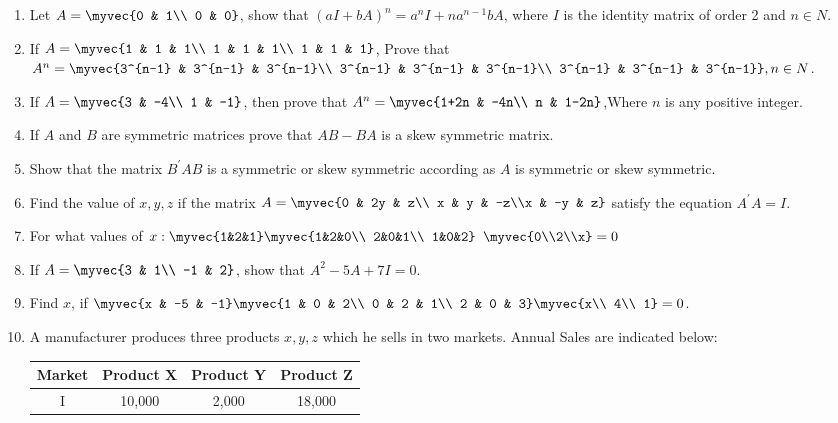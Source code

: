 \begin{enumerate}
\item Let $A=\myvec{0 & 1\\ 0 & 0}$, show that $(aI+bA)^n= a^nI+na^{n-1} bA$, where $I$ is the identity matrix of order 2 and $n \in N$.
\item If $A=\myvec{1 & 1 & 1\\ 1 & 1 & 1\\ 1 & 1 & 1}$, Prove that $A^n=\myvec{3^{n-1} & 3^{n-1} & 3^{n-1}\\ 3^{n-1} & 3^{n-1} & 3^{n-1}\\ 3^{n-1} & 3^{n-1} & 3^{n-1}}, n \in N$.
\item If $A=\myvec{3 & -4\\ 1 & -1}$, then prove that $A^n=\myvec{1+2n & -4n\\ n & 1-2n}$,Where $n$ is any positive integer.
\item If $A$ and $B$ are symmetric matrices prove that $AB-BA$ is a skew symmetric matrix.
\item Show that the matrix  $B^{\prime}AB$ is a symmetric or skew symmetric according as $A$ is symmetric or skew symmetric.
\item Find the value of $x,y,z$ if the matrix $A=\myvec{0 & 2y & z\\ x & y & -z\\x & -y & z}$ satisfy the equation $A^{\prime}A=I$.
\item For what values  of $x : \myvec{1&2&1} \myvec{1&2&0\\ 2&0&1\\ 1&0&2}$ $\myvec{0\\2\\x}=0$
\item If $A=\myvec{3 & 1\\ -1 & 2}$, show that $A^2-5A+7I=0$.
\item Find $x$, if $\myvec{x & -5 & -1} \myvec{1 & 0 & 2\\ 0 & 2 & 1\\ 2 & 0 & 3} \myvec{x\\ 4\\ 1}=0$. 
\item A manufacturer produces three products $x, y, z$ which he sells in two markets. Annual Sales are indicated below:
\begin{table}
\centering
\begin{tabular}{|c|c|c|c|}
\hline
Market &  Product X & Product Y & Product Z\\
\hline
I &10,000 &2,000 &18,000\\

\end{tabular}
\end{table}
\end{enumerate}

